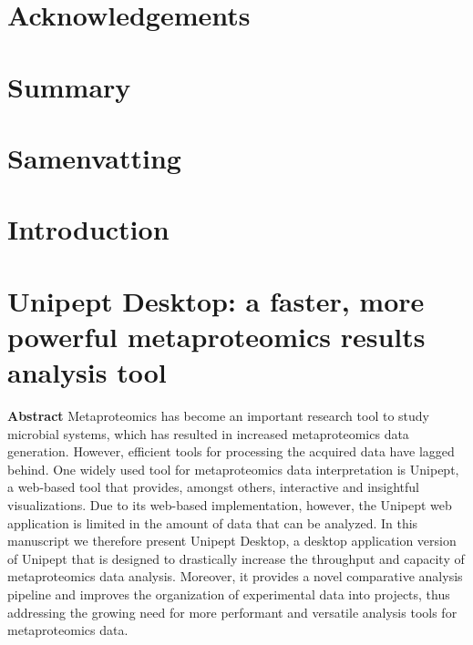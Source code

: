 \hypertarget{acknowledgements}{%
\chapter*{Acknowledgements}\label{acknowledgements}}

\hypertarget{summary}{%
\chapter*{Summary}\label{summary}}

\hypertarget{samenvatting}{%
\chapter*{Samenvatting}\label{samenvatting}}

\mainmatter

\hypertarget{introduction}{%
\chapter{Introduction}\label{introduction}}

\hypertarget{unipept-desktop-a-faster-more-powerful-metaproteomics-results-analysis-tool}{%
\chapter{Unipept Desktop: a faster, more powerful metaproteomics results
analysis
tool}\label{unipept-desktop-a-faster-more-powerful-metaproteomics-results-analysis-tool}}

\textbf{Abstract} Metaproteomics has become an important research tool
to study microbial systems, which has resulted in increased
metaproteomics data generation. However, efficient tools for processing
the acquired data have lagged behind. One widely used tool for
metaproteomics data interpretation is Unipept, a web-based tool that
provides, amongst others, interactive and insightful visualizations. Due
to its web-based implementation, however, the Unipept web application is
limited in the amount of data that can be analyzed. In this manuscript
we therefore present Unipept Desktop, a desktop application version of
Unipept that is designed to drastically increase the throughput and
capacity of metaproteomics data analysis. Moreover, it provides a novel
comparative analysis pipeline and improves the organization of
experimental data into projects, thus addressing the growing need for
more performant and versatile analysis tools for metaproteomics data.

